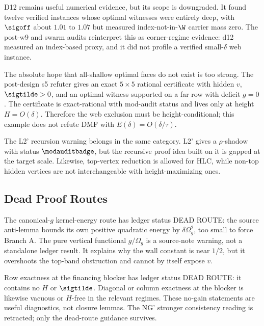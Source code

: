 \begin{downgradedstatement}[D12 scope]
\downgradedbadge D12 remains useful numerical evidence, but its scope is downgraded.
It found twelve verified instances whose optimal witnesses were entirely deep, with
\(\sigoff\) about \(1.01\) to \(1.07\) but measured index-not-in-\(\W\) carrier mass zero.  The
post-w9 and swarm audits reinterpret this as corner-regime evidence: d12 measured an
index-based proxy, and it did not profile a verified small-\(\delta\) web instance.
\end{downgradedstatement}

\begin{downgradedstatement}
\downgradedbadge The absolute hope that all-shallow optimal faces do not exist is too
strong.  The post-design s5 refuter gives an exact \(5\times5\) rational certificate
with hidden \(v\), \(\sigtilde>0\), and an optimal witness supported on a far row with
deficit \(g=0\).  The certificate is exact-rational with mod-audit status and lives only
at height \(H=O(\delta)\).  Therefore the web exclusion must be height-conditional; this
example does not refute DMF with \(E(\delta)=O(\delta/\tau)\).
\end{downgradedstatement}

The L2' recursion warning belongs in the same category.  L2' gives a
\(\rho\)-shadow with status \(\modauditbadge\), but the recursive proof idea built on it
is gapped at the target scale.  Likewise, top-vertex reduction is allowed for HLC, while
non-top hidden vertices are not interchangeable with height-maximizing ones.

\subsection{Dead Proof Routes}

The canonical-\(g\) kernel-energy route has ledger status DEAD ROUTE: the source
anti-lemma bounds its own positive quadratic energy by \(\delta\Omega_g^2\), too small
to force Branch A.  The pure vertical functional \(g/\Omega_g\) is a source-note warning,
not a standalone ledger result.  It explains why the wall constant is near \(1/2\), but
it overshoots the top-band obstruction and cannot by itself expose \(v\).

Row exactness at the financing blocker has ledger status DEAD ROUTE: it contains no
\(H\) or \(\sigtilde\).  Diagonal or column exactness at the blocker is likewise vacuous
or \(H\)-free in the relevant regimes.  These no-gain statements are useful diagnostics,
not closure lemmas.  The NG' stronger consistency reading is retracted; only the
dead-route guidance survives.

